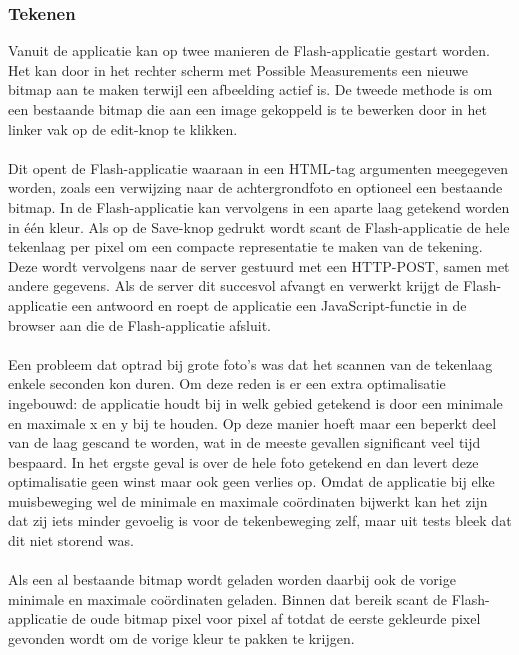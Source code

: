 \subsubsection{Tekenen}
Vanuit de applicatie kan op twee manieren de Flash-applicatie gestart worden. 
Het kan door in het rechter scherm met Possible Measurements een nieuwe bitmap aan te maken terwijl een afbeelding actief is. 
De tweede methode is om een bestaande bitmap die aan een image gekoppeld is te bewerken door in het linker vak op de edit-knop te klikken.
\\
\\
Dit opent de Flash-applicatie waaraan in een HTML-tag argumenten meegegeven worden, zoals een verwijzing naar de achtergrondfoto en optioneel een bestaande bitmap. 
In de Flash-applicatie kan vervolgens in een aparte laag getekend worden in \'{e}\'{e}n kleur. 
Als op de Save-knop gedrukt wordt scant de Flash-applicatie de hele tekenlaag per pixel om een compacte representatie te maken van de tekening. Deze wordt vervolgens naar de server gestuurd met een HTTP-POST, samen met andere gegevens. 
Als de server dit succesvol afvangt en verwerkt krijgt de Flash-applicatie een antwoord en roept de applicatie een JavaScript-functie in de browser aan die de Flash-applicatie afsluit.
\\
\\
Een probleem dat optrad bij grote foto's was dat het scannen van de tekenlaag enkele seconden kon duren. 
Om deze reden is er een extra optimalisatie ingebouwd: de applicatie houdt bij in welk gebied getekend is door een minimale en maximale x en y bij te houden. 
Op deze manier hoeft maar een beperkt deel van de laag gescand te worden, wat in de meeste gevallen significant veel tijd bespaard. 
In het ergste geval is over de hele foto getekend en dan levert deze optimalisatie geen winst maar ook geen verlies op. 
Omdat de applicatie bij elke muisbeweging wel de minimale en maximale co\"{o}rdinaten bijwerkt kan het zijn dat zij iets minder gevoelig is voor de tekenbeweging zelf, maar uit tests bleek dat dit niet storend was.
\\
\\
Als een al bestaande bitmap wordt geladen worden daarbij ook de vorige minimale en maximale co\"{o}rdinaten geladen. 
Binnen dat bereik scant de Flash-applicatie de oude bitmap pixel voor pixel af totdat de eerste gekleurde pixel gevonden wordt om de vorige kleur te pakken te krijgen. 

